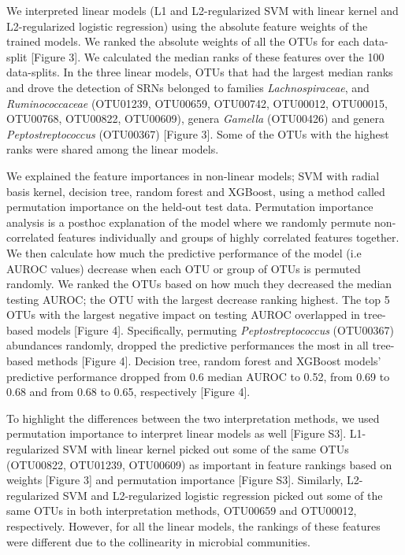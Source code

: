 \documentclass[11pt,]{article}
\begin{document}
We interpreted linear models (L1 and L2-regularized SVM with linear
kernel and L2-regularized logistic regression) using the absolute
feature weights of the trained models. We ranked the absolute weights of
all the OTUs for each data-split {[}Figure 3{]}. We calculated the
median ranks of these features over the 100 data-splits. In the three
linear models, OTUs that had the largest median ranks and drove the
detection of SRNs belonged to families \emph{Lachnospiraceae}, and
\emph{Ruminococcaceae} (OTU01239, OTU00659, OTU00742, OTU00012,
OTU00015, OTU00768, OTU00822, OTU00609), genera \emph{Gamella}
(OTU00426) and genera \emph{Peptostreptococcus} (OTU00367) {[}Figure
3{]}. Some of the OTUs with the highest ranks were shared among the
linear models.

We explained the feature importances in non-linear models; SVM with
radial basis kernel, decision tree, random forest and XGBoost, using a
method called permutation importance on the held-out test data.
Permutation importance analysis is a posthoc explanation of the model
where we randomly permute non-correlated features individually and
groups of highly correlated features together. We then calculate how
much the predictive performance of the model (i.e AUROC values) decrease
when each OTU or group of OTUs is permuted randomly. We ranked the OTUs
based on how much they decreased the median testing AUROC; the OTU with
the largest decrease ranking highest. The top 5 OTUs with the largest
negative impact on testing AUROC overlapped in tree-based models
{[}Figure 4{]}. Specifically, permuting \emph{Peptostreptococcus}
(OTU00367) abundances randomly, dropped the predictive performances the
most in all tree-based methods {[}Figure 4{]}. Decision tree, random
forest and XGBoost models' predictive performance dropped from 0.6
median AUROC to 0.52, from 0.69 to 0.68 and from 0.68 to 0.65,
respectively {[}Figure 4{]}.

To highlight the differences between the two interpretation methods, we
used permutation importance to interpret linear models as well {[}Figure
S3{]}. L1-regularized SVM with linear kernel picked out some of the same
OTUs (OTU00822, OTU01239, OTU00609) as important in feature rankings
based on weights {[}Figure 3{]} and permutation importance {[}Figure
S3{]}. Similarly, L2-regularized SVM and L2-regularized logistic
regression picked out some of the same OTUs in both interpretation
methods, OTU00659 and OTU00012, respectively. However, for all the
linear models, the rankings of these features were different due to the
collinearity in microbial communities.
\end{document}
